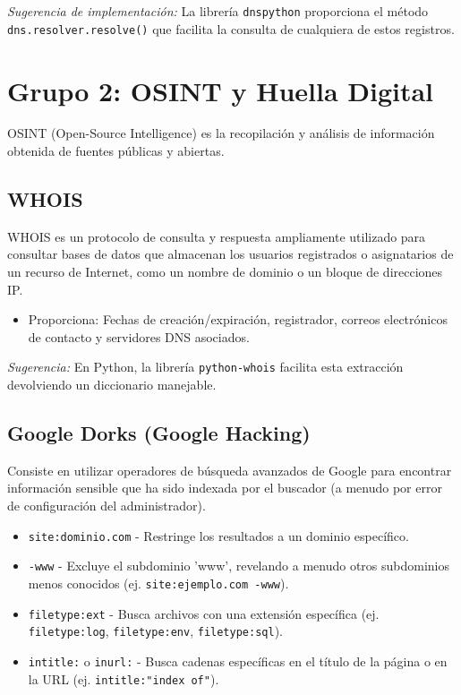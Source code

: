 \documentclass[12pt,a4paper]{article}
\begin{document}
\textit{Sugerencia de implementación:} La librería \texttt{dnspython} proporciona el método \texttt{dns.resolver.resolve()} que facilita la consulta de cualquiera de estos registros.

\section{Grupo 2: OSINT y Huella Digital}
OSINT (Open-Source Intelligence) es la recopilación y análisis de información obtenida de fuentes públicas y abiertas.

\subsection{WHOIS}
WHOIS es un protocolo de consulta y respuesta ampliamente utilizado para consultar bases de datos que almacenan los usuarios registrados o asignatarios de un recurso de Internet, como un nombre de dominio o un bloque de direcciones IP. 
\begin{itemize}
    \item Proporciona: Fechas de creación/expiración, registrador, correos electrónicos de contacto y servidores DNS asociados.
\end{itemize}
\textit{Sugerencia:} En Python, la librería \texttt{python-whois} facilita esta extracción devolviendo un diccionario manejable.

\subsection{Google Dorks (Google Hacking)}
Consiste en utilizar operadores de búsqueda avanzados de Google para encontrar información sensible que ha sido indexada por el buscador (a menudo por error de configuración del administrador).
\begin{itemize}
    \item \texttt{site:dominio.com} - Restringe los resultados a un dominio específico.
    \item \texttt{-www} - Excluye el subdominio 'www', revelando a menudo otros subdominios menos conocidos (ej. \texttt{site:ejemplo.com -www}).
    \item \texttt{filetype:ext} - Busca archivos con una extensión específica (ej. \texttt{filetype:log}, \texttt{filetype:env}, \texttt{filetype:sql}).
    \item \texttt{intitle:} o \texttt{inurl:} - Busca cadenas específicas en el título de la página o en la URL (ej. \texttt{intitle:"index of"}).
\end{itemize}
\end{document}
